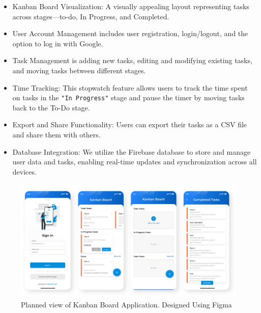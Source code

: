 \begin{itemize}
\item	Kanban Board Visualization: A visually appealing layout representing tasks across stages—to-do, In Progress, and Completed.
\item	User Account Management includes user registration, login/logout, and the option to log in with Google.  
\item  	Task Management is adding new tasks, editing and modifying existing tasks, and moving tasks between different stages.
\item 	Time Tracking: This stopwatch feature allows users to track the time spent on tasks in the \verb|"In Progress"| stage and pause the timer by moving tasks back to the To-Do stage.
\item 	Export and Share Functionality: Users can export their tasks as a CSV file and share them with others.
\item   Database Integration: We utilize the Firebase database to store and manage user data and tasks, enabling real-time updates and synchronization across all devices.
\end{itemize}

\begin{figure}[htbp]
    \centering
    \includegraphics[scale = 0.85]{img/kanban_board.png}
    \caption{Planned view of Kanban Board Application. Designed Using Figma}
    \label{fig:kanban_board}
\end{figure}

